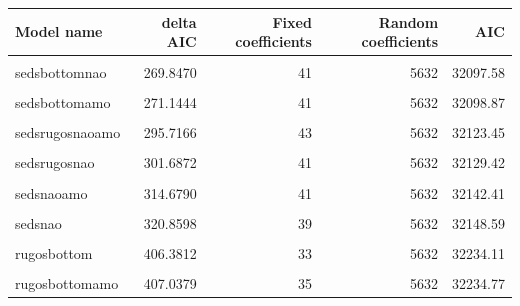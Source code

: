 \documentclass[
]{article}
\let\origtable\table
\let\endorigtable\endtable
\renewenvironment{table}[1][2] {
    \expandafter\origtable\expandafter[H]
} {
    \endorigtable
}
\begin{document}
\begin{table}[H]

\caption{\label{tab:covars}Table 2b: Model selection step 2 outcomes}
\centering
\begin{tabular}[t]{lrrrr}
\toprule
Model name & delta AIC & Fixed coefficients & Random coefficients & AIC\\
\midrule
\cellcolor{gray!10}{sedsrugosbottomamo} & \cellcolor{gray!10}{250.5617} & \cellcolor{gray!10}{43} & \cellcolor{gray!10}{5632} & \cellcolor{gray!10}{32078.29}\\
sedsbottomnao & 269.8470 & 41 & 5632 & 32097.58\\
\cellcolor{gray!10}{sedsbottomnaoamo} & \cellcolor{gray!10}{270.2860} & \cellcolor{gray!10}{43} & \cellcolor{gray!10}{5632} & \cellcolor{gray!10}{32098.01}\\
sedsbottomamo & 271.1444 & 41 & 5632 & 32098.87\\
\cellcolor{gray!10}{sedsbottom} & \cellcolor{gray!10}{271.2075} & \cellcolor{gray!10}{39} & \cellcolor{gray!10}{5632} & \cellcolor{gray!10}{32098.94}\\
\addlinespace
sedsrugosnaoamo & 295.7166 & 43 & 5632 & 32123.45\\
\cellcolor{gray!10}{sedsrugosamo} & \cellcolor{gray!10}{297.0664} & \cellcolor{gray!10}{41} & \cellcolor{gray!10}{5632} & \cellcolor{gray!10}{32124.80}\\
sedsrugosnao & 301.6872 & 41 & 5632 & 32129.42\\
\cellcolor{gray!10}{sedsrugos} & \cellcolor{gray!10}{304.0014} & \cellcolor{gray!10}{39} & \cellcolor{gray!10}{5632} & \cellcolor{gray!10}{32131.73}\\
sedsnaoamo & 314.6790 & 41 & 5632 & 32142.41\\
\addlinespace
\cellcolor{gray!10}{sedsamo} & \cellcolor{gray!10}{316.0543} & \cellcolor{gray!10}{39} & \cellcolor{gray!10}{5632} & \cellcolor{gray!10}{32143.78}\\
sedsnao & 320.8598 & 39 & 5632 & 32148.59\\
\cellcolor{gray!10}{seds} & \cellcolor{gray!10}{323.2514} & \cellcolor{gray!10}{37} & \cellcolor{gray!10}{5632} & \cellcolor{gray!10}{32150.98}\\
rugosbottom & 406.3812 & 33 & 5632 & 32234.11\\
\cellcolor{gray!10}{rugosbottomnao} & \cellcolor{gray!10}{406.5037} & \cellcolor{gray!10}{35} & \cellcolor{gray!10}{5632} & \cellcolor{gray!10}{32234.23}\\
\addlinespace
rugosbottomamo & 407.0379 & 35 & 5632 & 32234.77\\

\end{tabular}
\end{table}
\end{document}
